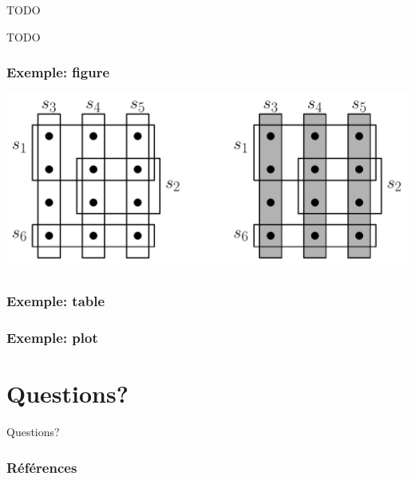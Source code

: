 \documentclass[aspectratio=169,11pt]{beamer}
\begin{document}

	\begin{frame}
		\centering TODO
	\end{frame}


	\begin{frame}
		\centering TODO
	\end{frame}

	\begin{frame}
		\frametitle{Exemple: figure}
		\centering
		\includegraphics[width=0.75\linewidth]{scp_example}%
	\end{frame}
	\begin{frame}
		\frametitle{Exemple: table}
		{
			\centering
			\footnotesize
			
		}
	\end{frame}
	\begin{frame}
		\frametitle{Exemple: plot}
		\centering
	\end{frame}
	\section*{Questions?}
		\begin{frame}[focus]
			Questions?
		\end{frame}
	\appendix
		\begin{frame}[t,allowframebreaks]
			\frametitle{Références}
			\printbibliography[heading=bibintoc]{}
		\end{frame}
\end{document}
